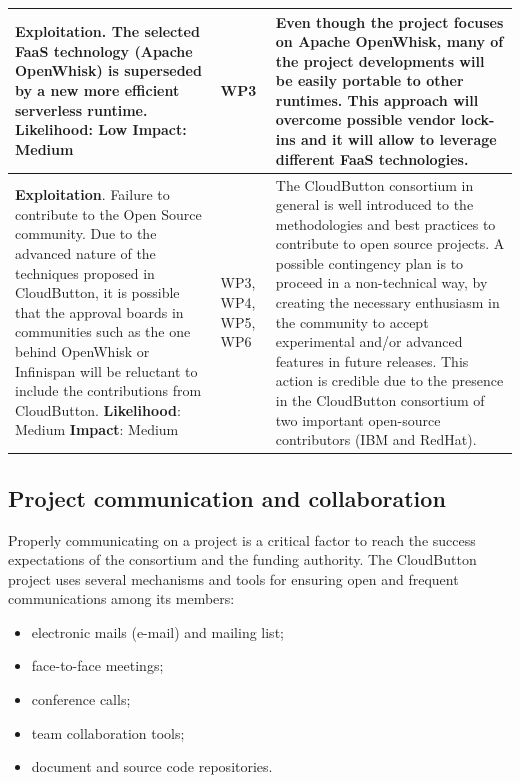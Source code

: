 \documentclass[a4paper,11pt]{article}
\newcommand{\proj}{CloudButton\xspace}
\begin{document}
{\begin{longtable} {| p{} | p{} | p{} | }
\textbf{Exploitation}. The selected FaaS technology (Apache OpenWhisk) is superseded by a new more efficient serverless runtime. \newline
\textbf{Likelihood}: Low \newline
\textbf{Impact}: Medium
& WP3 &
Even though the project focuses on Apache OpenWhisk, many of the project developments will be easily portable to other runtimes.
This approach will overcome possible vendor lock-ins and it will allow to leverage different FaaS technologies.
\\ \hline

\textbf{Exploitation}. Failure to contribute to the Open Source community. Due to the advanced nature of the techniques proposed in \proj, it is possible that the approval boards in communities such as the one behind OpenWhisk or Infinispan will be reluctant to include the contributions from \proj. \newline
\textbf{Likelihood}: Medium \newline
\textbf{Impact}: Medium
& WP3, WP4, WP5, WP6 &
The \proj consortium in general is well introduced to the methodologies and best practices to contribute to open source projects.
A possible contingency plan is to proceed in a non-technical way, by creating the necessary enthusiasm in the community to accept experimental and/or advanced features in future releases.
This action is credible due to the presence in the \proj consortium of two important open-source contributors (IBM and RedHat). \\ \hline 

 

\end{longtable}
}


\subsection{Project communication and collaboration}

Properly communicating on a project is a critical factor to reach the success expectations of the consortium and the funding authority. The \proj project uses several mechanisms and tools for ensuring open and frequent communications among its members:
\begin{itemize}
\item electronic mails (e-mail) and mailing list;
\item face-to-face meetings;
\item conference calls;
\item team collaboration tools;
\item document and source code repositories.
\end{itemize}
\end{document}
